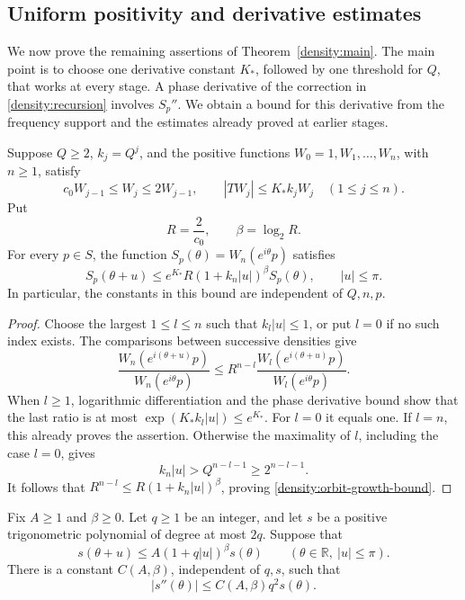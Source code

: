 \subsection{Uniform positivity and derivative estimates}

We now prove the remaining assertions of Theorem~\ref{density:main}.
The main point is to choose one derivative constant \(K_*\), followed
by one threshold for \(Q\), that works at every stage.  A phase
derivative of the correction in \eqref{density:recursion} involves
\(S_p''\).  We obtain a bound for this derivative from the frequency
support and the estimates already proved at earlier stages.

\begin{lemma}\label{density:orbit-growth}
Suppose \(Q\ge2\), \(k_j=Q^j\), and the positive functions
\(W_0=1,W_1,\ldots,W_n\), with \(n\ge1\), satisfy
\[
 c_0W_{j-1}\le W_j\le2W_{j-1},
 \qquad |TW_j|\le K_*k_jW_j
 \quad(1\le j\le n).
\]
Put
\[
 R=\frac2{c_0},\qquad \beta=\log_2R.
\]
For every \(p\in S\), the function
\(S_p(\theta)=W_n(e^{i\theta}p)\) satisfies
\begin{equation}\label{density:orbit-growth-bound}
 S_p(\theta+u)
 \le e^{K_*}R(1+k_n|u|)^\beta S_p(\theta),
 \qquad |u|\le\pi.
\end{equation}
In particular, the constants in this bound are independent of \(Q,n,p\).
\end{lemma}

\begin{proof}
Choose the largest \(1\le l\le n\) such that \(k_l|u|\le1\),
or put \(l=0\) if no such index exists.  The comparisons between
successive densities give
\[
 \frac{W_n(e^{i(\theta+u)}p)}{W_n(e^{i\theta}p)}
 \le R^{n-l}
 \frac{W_l(e^{i(\theta+u)}p)}{W_l(e^{i\theta}p)}.
\]
When \(l\ge1\), logarithmic differentiation and the phase derivative
bound show that the last ratio is at most
\(\exp(K_*k_l|u|)\le e^{K_*}\).
For \(l=0\) it equals one.
If \(l=n\), this already proves the assertion.
Otherwise the maximality of \(l\), including the case \(l=0\), gives
\[
 k_n|u|>Q^{n-l-1}\ge2^{n-l-1}.
\]
It follows that
\(R^{n-l}\le R(1+k_n|u|)^\beta\), proving
\eqref{density:orbit-growth-bound}.
\end{proof}

\begin{lemma}\label{density:weighted-derivative}
Fix \(A\ge1\) and \(\beta\ge0\).  Let \(q\ge1\) be an integer,
and let \(s\) be a positive trigonometric polynomial of degree at most
\(2q\).  Suppose that
\[
 s(\theta+u)\le A(1+q|u|)^\beta s(\theta)
 \qquad(\theta\in\mathbb R,\ |u|\le\pi).
\]
There is a constant \(C(A,\beta)\), independent of \(q,s\), such that
\[
 |s''(\theta)|\le C(A,\beta)q^2s(\theta).
\]
\end{lemma}


